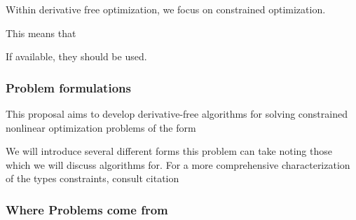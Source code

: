 Within derivative free optimization, we focus on constrained optimization.


This means that 



























If available, they should be used. 


\subsubsection{Problem formulations}

This proposal aims to develop derivative-free algorithms for solving constrained nonlinear optimization problems of the form

We will introduce several different forms this problem can take noting those which we will discuss algorithms for.
For a more comprehensive characterization of the types constraints, consult \color{red}citation\color{black} %


\subsubsection{Where Problems come from}




